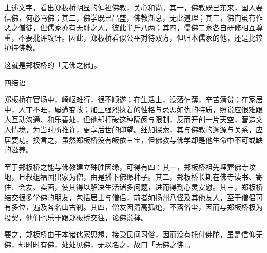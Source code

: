 上述文字，看出郑板桥明显的偏袒佛教，关心和尚。其一，佛教既已东来，国人要信佛，何必骂佛；其二，佛学既已昌盛，佛教渐息，无此道理；其三，佛门虽有作恶之僧徒，但儒家亦有无耻之人，彼此半斤八两；其四，儒佛二家各自研修相互尊重，不要批评攻讦。因此，郑板桥看似公平对待双方，但归本儒家的他，还是比较护持佛教。

这就是郑板桥的「无佛之佛」。

\vfill
\begin{BookNotes}
\end{BookNotes}

四结语

郑板桥在官场中，崎岖难行，很不顺遂；在生活上，没落乍薄，辛苦清贫；在家居中，人丁不旺，屡遭变故；加上强烈执着的性格与忌恶如仇的特质，照说应很难跟人互动沟通、和乐善处，但他却打破这种隔阂与限制，反而开创一片天空，营造文人情境，为当时所推许，更享后世的仰望。细加探索，其与佛教的渊源与关系，应居要功。换言之，虽然郑板桥没有皈依三宝，但佛教与佛学却是他生命中不可或缺的滋养。

至于郑板桥之能与佛教建立殊胜因缘，可得有四：其一，郑板桥祖先埋葬佛寺坟地，且叔组福国出家为僧，由是播下佛缘种子。其二，郑板桥长期在佛寺读书、寄住、会友、卖画，使其得以解决生活诸多问题，进而得到心灵安慰。其三，郑板桥结交很多学佛的朋友，包括居士与僧侣，前者如扬州八怪及其他友人，至于僧侣可有多位，遍及各名山古刹。其四，僧友因清高孤绝，不落俗尘，因而与郑板桥极为投契，他们也乐于跟郑板桥交往，论佛说禅。

要之，郑板桥由于本诸儒家思想，接受民间习俗，因而没有托付佛陀，虽是信仰无佛，却时时有佛，处处见佛，无以名之，故曰「无佛之佛」。
